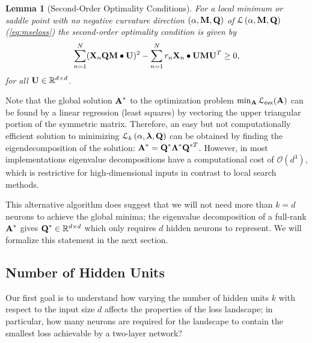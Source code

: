 \documentclass[11pt]{article}
\theoremstyle{plain}
\newtheorem{lemma}{Lemma}
\def\R{\mathbb{R}}
\theoremstyle{plain}
\numberwithin{equation}{section}
\numberwithin{lemma}{section}
\numberwithin{theorem}{section}
\numberwithin{corollary}{section}
\numberwithin{observation}{section}
\numberwithin{definition}{section}
\numberwithin{example}{section}
\begin{document}
\begin{lemma}[Second-Order Optimality Conditions] \label{lem:modified_kkt_second_order}
For a local minimum or saddle point with no negative curvature direction $(\alpha,\Mx{M}, \Mx{Q})$ of $\mathcal{L} \left( {\alpha, \Mx{M},\Mx{Q}} \right)$ (\ref{eq:mseloss}) the second-order optimality condition is given by
\begin{align} \label{eq:second_order_optimality}
\sum_{n=1}^N (\Mx{X}_n \Mx{Q} \Mx{M} \bullet \Mx{U})^2 -\sum_{n=1}^N r_n \Mx{X}_n \bullet \Mx{U} \Mx{M} \Mx{U}^T \geq 0,
\end{align}
for all $\Mx{U} \in \R^{d \times d}$.
\end{lemma}






\noindent Note that the global solution $\Mx{A}^*$ to the optimization problem $\min_{\Mx{A}} \mathcal{L}_{\sf cvx}(\Mx{A})$ can be found by a linear regression (least squares) by vectoring the upper triangular portion of the symmetric matrix. Therefore, an easy but not computationally efficient solution to minimizing $\mathcal{L}_k \left(\alpha, {\V{\lambda},\Mx{Q}} \right)$ can be obtained by finding the eigendecomposition of the solution: $\Mx{A}^* = \Mx{Q}^* \Mx{\Lambda}^* \Mx{Q}^{*T}$. However, in most implementations eigenvalue decompositions have a computational cost of $\mathcal{O}(d^3)$, which is restrictive for high-dimensional inputs in contrast to local search methods.

This alternative algorithm does suggest that we will not need more than $k = d$ neurons to achieve the global minima; the eigenvalue decomposition of a full-rank $\Mx{A}^*$ gives $\Mx{Q}^* \in \R^{d \times d}$ which only requires $d$ hidden neurons to represent. We will formalize this statement in the next section.

\subsection{Number of Hidden Units} 
Our first goal is to understand how varying the number of hidden units $k$ with respect to the input size $d$ affects the properties of the loss landscape; in particular, how many neurons are required for the landscape to contain the smallest loss achievable by a two-layer network?  
\end{document}
